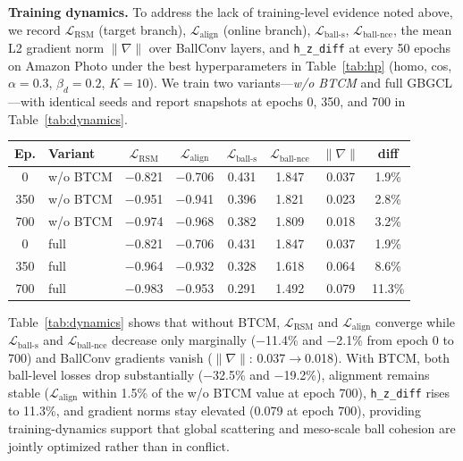 \documentclass[conference]{IEEEtran}
\begin{document}
\textbf{Training dynamics.}
To address the lack of training-level evidence noted above, we record $\mathcal{L}_{\mathrm{RSM}}$ (target branch), $\mathcal{L}_{\mathrm{align}}$ (online branch), $\mathcal{L}_{\mathrm{ball\mbox{-}s}}$, $\mathcal{L}_{\mathrm{ball\mbox{-}nce}}$, the mean L2 gradient norm $\|\nabla\|$ over BallConv layers, and \texttt{h\_z\_diff} at every 50 epochs on Amazon Photo under the best hyperparameters in Table~\ref{tab:hp} (homo, cos, $\alpha{=}0.3$, $\beta_d{=}0.2$, $K{=}10$).
We train two variants---\emph{w/o BTCM} and full GBGCL---with identical seeds and report snapshots at epochs 0, 350, and 700 in Table~\ref{tab:dynamics}.
\begin{center}
  \scriptsize
  \setlength{\tabcolsep}{2pt}
  \label{tab:dynamics}
  \begin{tabular}{clcccccc}
    \toprule
    Ep. & Variant & $\mathcal{L}_{\mathrm{RSM}}$ & $\mathcal{L}_{\mathrm{align}}$ & $\mathcal{L}_{\mathrm{ball\mbox{-}s}}$ & $\mathcal{L}_{\mathrm{ball\mbox{-}nce}}$ & $\|\nabla\|$ & diff \\
    \midrule
    0   & w/o BTCM & $-$0.821 & $-$0.706 & 0.431 & 1.847 & 0.037 & 1.9\% \\
    350 & w/o BTCM & $-$0.951 & $-$0.941 & 0.396 & 1.821 & 0.023 & 2.8\% \\
    700 & w/o BTCM & $-$0.974 & $-$0.968 & 0.382 & 1.809 & 0.018 & 3.2\% \\
    \midrule
    0   & full     & $-$0.821 & $-$0.706 & 0.431 & 1.847 & 0.037 & 1.9\% \\
    350 & full     & $-$0.964 & $-$0.932 & 0.328 & 1.618 & 0.064 & 8.6\% \\
    700 & full     & $-$0.983 & $-$0.953 & 0.291 & 1.492 & 0.079 & 11.3\% \\
    \bottomrule
  \end{tabular}
\end{center}
Table~\ref{tab:dynamics} shows that without BTCM, $\mathcal{L}_{\mathrm{RSM}}$ and $\mathcal{L}_{\mathrm{align}}$ converge while $\mathcal{L}_{\mathrm{ball\mbox{-}s}}$ and $\mathcal{L}_{\mathrm{ball\mbox{-}nce}}$ decrease only marginally ($-$11.4\% and $-$2.1\% from epoch 0 to 700) and BallConv gradients vanish ($\|\nabla\|$: 0.037$\rightarrow$0.018).
With BTCM, both ball-level losses drop substantially ($-$32.5\% and $-$19.2\%), alignment remains stable ($\mathcal{L}_{\mathrm{align}}$ within 1.5\% of the w/o BTCM value at epoch 700), \texttt{h\_z\_diff} rises to 11.3\%, and gradient norms stay elevated (0.079 at epoch 700), providing training-dynamics support that global scattering and meso-scale ball cohesion are jointly optimized rather than in conflict.
\end{document}
